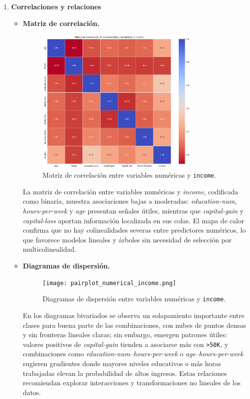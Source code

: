 \documentclass[12pt,a4paper]{article}
\begin{document}
\begin{enumerate}
    \item \textbf{Correlaciones y relaciones}
    \begin{itemize}
      \item \textbf{Matriz de correlación.}
      \begin{figure}[H]
        \centering
        \includegraphics[width=0.8\textwidth]{correlation_matrix_numerical_income.png}
        \caption{Matriz de correlación entre variables numéricas y \texttt{income}.}
        \label{fig:correlation_matrix}
      \end{figure}

      La matriz de correlación entre variables numéricas y \emph{income}, codificada como binaria, muestra asociaciones bajas 
      a moderadas: \emph{education-num}, \emph{hours-per-week} y \emph{age} presentan señales útiles, mientras que \emph{capital-gain} 
      y \emph{capital-loss} aportan información localizada en sus colas. El mapa de calor confirma que no hay colinealidades severas entre 
      predictores numéricos, lo que favorece modelos lineales y árboles sin necesidad de selección por multicolinealidad.
      \vfil

      \item \textbf{Diagramas de dispersión.}
      \begin{figure}[H]
        \centering
        \texttt{[image: pairplot\_numerical\_income.png]}
        \caption{Diagramas de dispersión entre variables numéricas y \texttt{income}.}
        \label{fig:scatter_matrix_income}
      \end{figure}

      En los diagramas bivariados se observa un solapamiento importante entre clases para buena parte de las combinaciones, con nubes de 
      puntos densas y sin fronteras lineales claras; sin embargo, emergen patrones útiles: valores positivos de \emph{capital-gain} tienden a 
      asociarse más con \texttt{>50K}, y combinaciones como \emph{education-num}–\emph{hours-per-week} o \emph{age}–\emph{hours-per-week} 
      sugieren gradientes donde mayores niveles educativos o más horas trabajadas elevan la probabilidad de altos ingresos. Estas relaciones 
      recomiendan explorar interacciones y transformaciones no lineales de los datos.


\end{itemize}
\end{enumerate}
\end{document}
